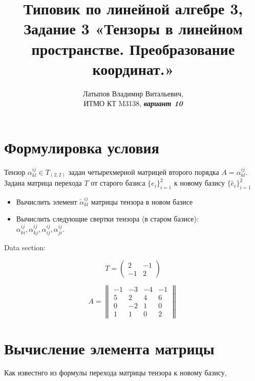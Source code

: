\documentclass[12pt, a4paper]{article}
\author{Латыпов Владимир Витальевич, \\ ИТМО КТ M3138, \Huge{\textit{\textbf{вариант 10}}}}
\title{Типовик по линейной алгебре 3, Задание 3 «Тензоры в линейном пространстве. Преобразование координат.»}
\begin{document}
    \tit

    \section{Формулировка условия}

    \begin{statement}
        Тензор $\alpha^{ij}_{kl} \in T_{(2, 2)}$ 
        задан четырехмерной матрицей второго порядка $A = \alpha^{ij}_{kl}$. 
        Задана матрица перехода $T$ от старого базиса $\{e_i\}_{i = 1}^2$
        к новому базису $\{\tilde{e_i}\}_{i = 1}^2$

        \begin{itemize}
            \item Вычислить элемент $\tilde{\alpha}^{ij}_{kl}$ матрицы тензора в новом базисе    
            \item Вычислить следующие свертки тензора (в старом базисе): \\
            $\alpha^{ij}_{ki}, \alpha^{ij}_{kj}, \alpha^{ij}_{ij}, \alpha^{ij}_{ji}$.
        \end{itemize}

        Data section:

        \begin{equation}
            T = \begin{pmatrix}
                2 & -1 \\
                -1 & 2
            \end{pmatrix}
        \end{equation}

        \begin{equation}
            A=\left\|\begin{array}{ll|ll}
                -1 & -3 & -4 & -1 \\
                5 & 2 & 4 & 6 \\
                \hline 
                0 & -2 & 1 & 0 \\
                1 & 1 & 0 & 2
            \end{array}\right\|
         \end{equation}
    \end{statement}

    \section{Вычисление элемента матрицы}
    
    Как известнго из формулы перехода матрицы тензора к новому базису, 
\end{document}
